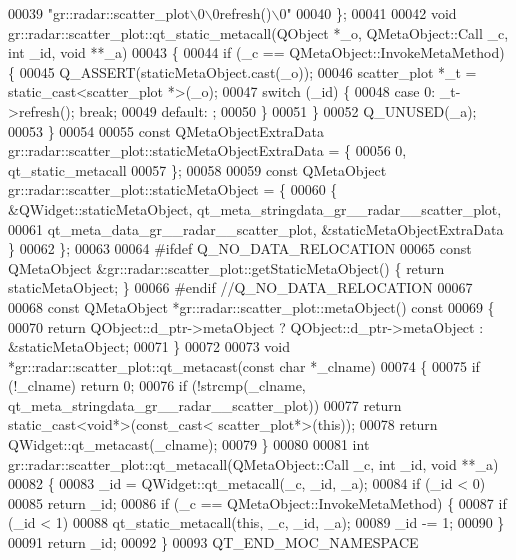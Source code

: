 \begin{DoxyCode}
00039     \textcolor{stringliteral}{"gr::radar::scatter\_plot\(\backslash\)0\(\backslash\)0refresh()\(\backslash\)0"}
00040 \};
00041 
00042 \textcolor{keywordtype}{void} gr::radar::scatter\_plot::qt\_static\_metacall(QObject *\_o, QMetaObject::Call \_c, \textcolor{keywordtype}{int} \_id, \textcolor{keywordtype}{void} **\_a)
00043 \{
00044     \textcolor{keywordflow}{if} (\_c == QMetaObject::InvokeMetaMethod) \{
00045         Q\_ASSERT(staticMetaObject.cast(\_o));
00046         scatter_plot *\_t = \textcolor{keyword}{static\_cast<}scatter_plot *\textcolor{keyword}{>}(\_o);
00047         \textcolor{keywordflow}{switch} (\_id) \{
00048         \textcolor{keywordflow}{case} 0: \_t->refresh(); \textcolor{keywordflow}{break};
00049         \textcolor{keywordflow}{default}: ;
00050         \}
00051     \}
00052     Q\_UNUSED(\_a);
00053 \}
00054 
00055 \textcolor{keyword}{const} QMetaObjectExtraData gr::radar::scatter\_plot::staticMetaObjectExtraData = \{
00056     0,  qt\_static\_metacall 
00057 \};
00058 
00059 \textcolor{keyword}{const} QMetaObject gr::radar::scatter\_plot::staticMetaObject = \{
00060     \{ &QWidget::staticMetaObject, qt_meta_stringdata_gr__radar__scatter_plot,
00061       qt_meta_data_gr__radar__scatter_plot, &staticMetaObjectExtraData \}
00062 \};
00063 
00064 \textcolor{preprocessor}{#ifdef Q\_NO\_DATA\_RELOCATION}
00065 \textcolor{keyword}{const} QMetaObject &gr::radar::scatter\_plot::getStaticMetaObject() \{ \textcolor{keywordflow}{return} staticMetaObject; \}
00066 \textcolor{preprocessor}{#endif //Q\_NO\_DATA\_RELOCATION}
00067 
00068 \textcolor{keyword}{const} QMetaObject *gr::radar::scatter\_plot::metaObject()\textcolor{keyword}{ const}
00069 \textcolor{keyword}{}\{
00070     \textcolor{keywordflow}{return} QObject::d\_ptr->metaObject ? QObject::d\_ptr->metaObject : &staticMetaObject;
00071 \}
00072 
00073 \textcolor{keywordtype}{void} *gr::radar::scatter\_plot::qt\_metacast(\textcolor{keyword}{const} \textcolor{keywordtype}{char} *\_clname)
00074 \{
00075     \textcolor{keywordflow}{if} (!\_clname) \textcolor{keywordflow}{return} 0;
00076     \textcolor{keywordflow}{if} (!strcmp(\_clname, qt_meta_stringdata_gr__radar__scatter_plot))
00077         \textcolor{keywordflow}{return} \textcolor{keyword}{static\_cast<}\textcolor{keywordtype}{void}*\textcolor{keyword}{>}(\textcolor{keyword}{const\_cast<} scatter_plot*\textcolor{keyword}{>}(\textcolor{keyword}{this}));
00078     \textcolor{keywordflow}{return} QWidget::qt\_metacast(\_clname);
00079 \}
00080 
00081 \textcolor{keywordtype}{int} gr::radar::scatter\_plot::qt\_metacall(QMetaObject::Call \_c, \textcolor{keywordtype}{int} \_id, \textcolor{keywordtype}{void} **\_a)
00082 \{
00083     \_id = QWidget::qt\_metacall(\_c, \_id, \_a);
00084     \textcolor{keywordflow}{if} (\_id < 0)
00085         \textcolor{keywordflow}{return} \_id;
00086     \textcolor{keywordflow}{if} (\_c == QMetaObject::InvokeMetaMethod) \{
00087         \textcolor{keywordflow}{if} (\_id < 1)
00088             qt\_static\_metacall(\textcolor{keyword}{this}, \_c, \_id, \_a);
00089         \_id -= 1;
00090     \}
00091     \textcolor{keywordflow}{return} \_id;
00092 \}
00093 QT\_END\_MOC\_NAMESPACE
\end{DoxyCode}
